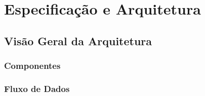 \chapter{Especificação e Arquitetura} \label{cap:especificacao}

\section{Visão Geral da Arquitetura}
\subsection{Componentes}
\subsection{Fluxo de Dados}
